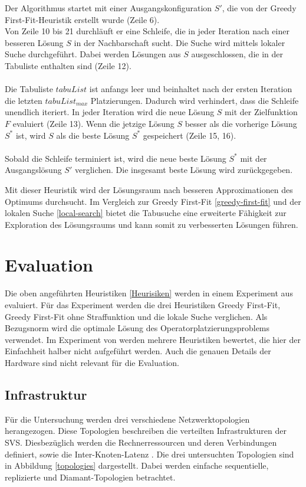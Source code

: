 \documentclass{article}
\begin{document}
Der Algorithmus startet mit einer Ausgangskonfiguration $S'$, die von der Greedy First-Fit-Heuristik erstellt wurde (Zeile 6). \\ 
Von Zeile 10 bis 21 durchläuft er eine Schleife, die in jeder Iteration nach einer besseren Lösung $S$ in der Nachbarschaft sucht. 
Die Suche wird mittels lokaler Suche durchgeführt. Dabei werden Lösungen aus $S$ ausgeschlossen, die in der Tabuliste enthalten sind (Zeile 12). \\ \\
Die Tabuliste $tabuList$ ist anfangs leer und beinhaltet nach der ersten Iteration die letzten $tabuList_{max}$ Platzierungen. 
Dadurch wird verhindert, dass die Schleife unendlich iteriert.
In jeder Iteration wird die neue Lösung $S$ mit der Zielfunktion $F$ evaluiert (Zeile 13). %
Wenn die jetzige Lösung $S$ besser als die vorherige Lösung $S^*$ ist, wird $S$ als die beste Lösung $S^*$ gespeichert (Zeile 15, 16). \\ \\
Sobald die Schleife terminiert ist, wird die neue beste Lösung $S^*$ mit der Ausgangslösung $S'$ verglichen. Die insgesamt beste Lösung wird zurückgegeben. 



Mit dieser Heuristik wird der Lösungsraum nach besseren Approximationen des Optimums durchsucht. 
Im Vergleich zur Greedy First-Fit \ref{greedy-first-fit} und der 
lokalen Suche \ref{local-search} bietet die Tabusuche eine erweiterte Fähigkeit zur Exploration 
des Lösungsraums und kann somit zu verbesserten Lösungen führen.



\section{Evaluation}
Die oben angeführten Heuristiken \ref{Heurisiken} werden in einem Experiment aus \cite{efficient-operator-placement} evaluiert. 
Für das Experiment werden die drei Heuristiken Greedy First-Fit, Greedy First-Fit ohne Straffunktion und die lokale Suche verglichen. 
Als Bezugsnorm wird die optimale Lösung des Operatorplatzierungsproblems verwendet. 
Im Experiment von \cite{efficient-operator-placement} werden mehrere Heuristiken bewertet, die hier der Einfachheit halber nicht aufgeführt werden. 
Auch die genauen Details der Hardware sind nicht relevant für die Evaluation.


\subsection{Infrastruktur}
Für die Untersuchung werden drei verschiedene Netzwerktopologien herangezogen. 
Diese Topologien beschreiben die verteilten Infrastrukturen der SVS. 
Diesbezüglich werden die Rechnerressourcen und deren Verbindungen definiert, sowie die Inter-Knoten-Latenz \cite{efficient-operator-placement}. 
Die drei untersuchten Topologien sind in Abbildung \ref{topologies} dargestellt. Dabei werden einfache sequentielle, replizierte und Diamant-Topologien betrachtet. \\
\end{document}
